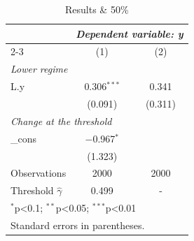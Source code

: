 \begin{table}[!htbp]
\centering
\footnotesize
\caption{Results \& 50\%}
\label{tab:main}
\begin{tabular}{lcc}
\toprule
 & \multicolumn{2}{c}{\textit{Dependent variable: y}} \\
\cmidrule(lr){2-3}
 & (1) & (2) \\
\midrule
\multicolumn{3}{l}{\textit{Lower regime}} \\
L.y & 0.306$^{***}$ & 0.341 \\
 & (0.091) & (0.311) \\
\multicolumn{3}{l}{\textit{Change at the threshold}} \\
\_cons & $-$0.967$^{*}$ &  \\
 & (1.323) &  \\
\midrule
Observations & 2000 & 2000 \\
Threshold $\hat{\gamma}$ & 0.499 & - \\
\bottomrule
\multicolumn{3}{l}{\footnotesize $^{*}$p\textless{}0.1; $^{**}$p\textless{}0.05; $^{***}$p\textless{}0.01} \\
\multicolumn{3}{l}{\footnotesize Standard errors in parentheses.} \\
\end{tabular}
\end{table}
